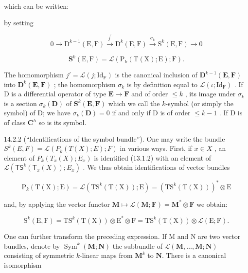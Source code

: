 which can be written:

by setting

\[
0 \rightarrow \mathrm{D} ^ {k - 1} (\mathrm{E}, \mathrm{F}) \xrightarrow {j ^ {\prime}} \mathrm{D} ^ {k} (\mathrm{E}, \mathrm{F}) \xrightarrow {\sigma_ {k}} \mathrm{S} ^ {k} (\mathrm{E}, \mathrm{F}) \rightarrow 0
\]

\[
\mathbf {S} ^ {k} (\mathrm{E}, \mathrm{F}) = \mathcal {L} (\mathrm{P} _ {k} (\mathrm{T} (\mathrm{X}); \mathrm{E}); \mathrm{F}).
\]

The homomorphism \(j' = \mathcal{L}(j; \mathrm{Id}_{\mathrm{F}})\) is the canonical inclusion of \(\mathbf{D}^{k-1}(\mathbf{E}, \mathbf{F})\) into \(\mathbf{D}^k(\mathbf{E}, \mathbf{F})\) ; the homomorphism \(\sigma_k\) is by definition equal to \(\mathcal{L}(\iota; \mathrm{Id}_{\mathrm{F}})\) . If D is a differential operator of type \(\mathbf{E} \to \mathbf{F}\) and of order \(\leqslant k\) , its image under \(\sigma_k\) is a section \(\sigma_k(\mathbf{D})\) of \(\mathbf{S}^k(\mathbf{E}, \mathbf{F})\) which we call the \(k\)-symbol (or simply the symbol) of D; we have \(\sigma_k(\mathbf{D}) = 0\) if and only if D is of order \(\leqslant k - 1\) . If D is of class \(\mathbf{C}^h\) so is its symbol.

14.2.2 (“Identifications of the symbol bundle”). One may write the bundle \(S^{k}(E, F) = \mathcal{L}(P_{k}(T(X); E); F)\) in various ways. First, if \(x \in X\) , an element of \(P_{k}(T_{x}(X); E_{x})\) is identified (13.1.2) with an element of \(\mathcal{L}(\mathsf{T}\mathsf{S}^{k}(\mathsf{T}_{x}(X)); E_{x})\) . We thus obtain identifications of vector bundles

\[
\mathrm{P} _ {k} (\mathrm{T} (\mathrm{X}); \mathrm{E}) = \mathscr {L} (\mathrm{TS} ^ {k} (\mathrm{T} (\mathrm{X})); \mathrm{E}) = (\mathrm{TS} ^ {k} (\mathrm{T} (\mathrm{X}))) ^ {*} \otimes \mathrm{E}
\]

and, by applying the vector functor \(\mathbf{M} \mapsto \mathcal{L}(\mathbf{M}; \mathbf{F}) = \mathbf{M}^* \otimes \mathbf{F}\) we obtain:

\[
\mathrm{S} ^ {k} (\mathrm{E}, \mathrm{F}) = \mathrm{T} \mathrm{S} ^ {k} (\mathrm{T} (\mathrm{X})) \otimes \mathrm{E} ^ {*} \otimes \mathrm{F} = \mathrm{T} \mathrm{S} ^ {k} (\mathrm{T} (\mathrm{X})) \otimes \mathscr {L} (\mathrm{E}; \mathrm{F}).
\]

One can further transform the preceding expression. If M and N are two vector bundles, denote by \(\operatorname{Sym}^{k}(\mathbf{M};\mathbf{N})\) the subbundle of \(\mathcal{L}(\mathbf{M},\ldots,\mathbf{M};\mathbf{N})\) consisting of symmetric \(k\)-linear maps from \(\mathbf{M}^{k}\) to \(\mathbf{N}\). There is a canonical isomorphism

